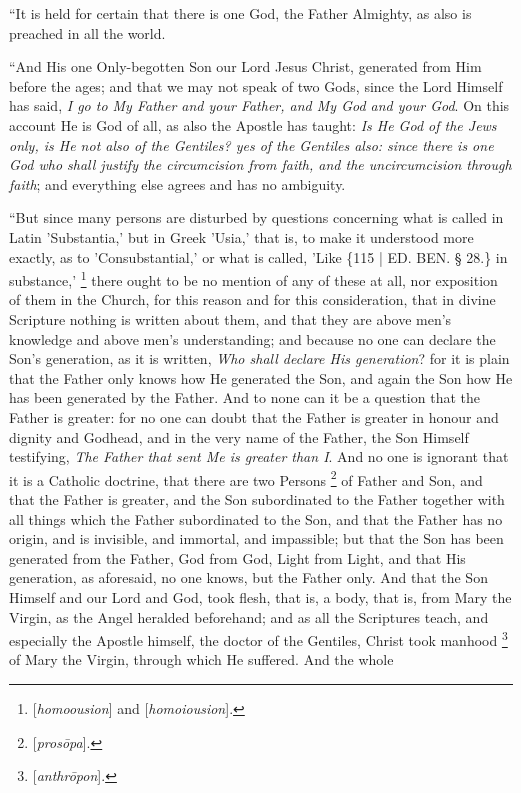 ``It is held for certain that
there is one God, the Father Almighty, as also is preached in all the
world.

``And His one Only-begotten Son
our Lord Jesus Christ, generated from Him before the ages; and that we
may not speak of two Gods, since the Lord Himself has said, \emph{I go to
My Father and your Father, and My God and your God}. On this
account He is God of all, as also the Apostle has taught: \emph{Is He God
of the Jews only, is He not also of the Gentiles? yes of the Gentiles
also: since there is one God who shall justify the circumcision from
faith, and the uncircumcision through faith}; and everything else
agrees and has no ambiguity.

``But since many persons are
disturbed by questions concerning what is called in Latin 'Substantia,'
but in Greek 'Usia,' that is, to make it understood more exactly, as
to 'Consubstantial,' or what is called, 'Like \{115 | ED. BEN.
§ 28.\} in substance,' \footnote{[\emph{homoousion}] and [\emph{homoiousion}].}
there ought to be no mention of any of these at all, nor exposition of
them in the Church, for this reason and for this consideration, that
in divine Scripture nothing is written about them, and that they are
above men's knowledge and above men's understanding; and because no
one can declare the Son's generation, as it is written, \emph{Who shall
declare His generation}? for it is plain that the Father only knows
how He generated the Son, and again the Son how He has been generated
by the Father. And to none can it be a question that the Father is
greater: for no one can doubt that the Father is greater in honour and
dignity and Godhead, and in the very name of the Father, the Son
Himself testifying, \emph{The Father that sent Me is greater than I}.
And no one is ignorant that it is a Catholic doctrine, that there are
two Persons \footnote{[\emph{pros\={o}pa}].} of Father
and Son, and that the Father is greater, and the Son subordinated to
the Father together with all things which the Father subordinated to
the Son, and that the Father has no origin, and is invisible, and
immortal, and impassible; but that the Son has been generated from the
Father, God from God, Light from Light, and that His generation, as
aforesaid, no one knows, but the Father only. And that the Son Himself
and our Lord and God, took flesh, that is, a body, that is, from Mary
the Virgin, as the Angel heralded beforehand; and as all the
Scriptures teach, and especially the Apostle himself, the doctor of
the Gentiles, Christ took manhood \footnote{[\emph{anthr\={o}pon}].} of Mary the Virgin, through which He suffered. And the whole
